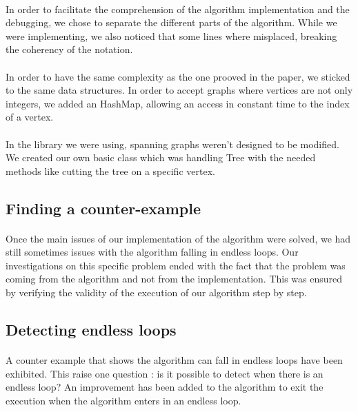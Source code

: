 \paragraph{}
In order to facilitate the comprehension of the algorithm implementation and the
debugging, we chose to separate the different parts of the algorithm. While
we were implementing, we also noticed that some lines where misplaced, breaking
the coherency of the notation.

\paragraph{}
In order to have the same complexity as the one prooved in the paper, we sticked
to the same data structures. In order to accept graphs where vertices are not
only integers, we added an HashMap, allowing an access in constant time to the
index of a vertex.

\paragraph{}
In the library we were using, spanning graphs weren't designed to be modified. We
created our own basic class which was handling Tree with the needed methods like
cutting the tree on a specific vertex.

\subsection{Finding a counter-example}
\paragraph{}
Once the main issues of our implementation of the algorithm were solved, we
had still sometimes issues with the algorithm falling in endless loops. Our
investigations on this specific problem ended with the fact that the problem was
coming from the algorithm and not from the implementation. This was ensured by
verifying the validity of the execution of our algorithm step by step.



\subsection{Detecting endless loops}
\paragraph{}
A counter example that shows the algorithm can fall in endless loops have been
exhibited. This raise one question : is it possible to detect when there is an
endless loop? An improvement has been added to the algorithm to exit the
execution when the algorithm enters in an endless loop.

